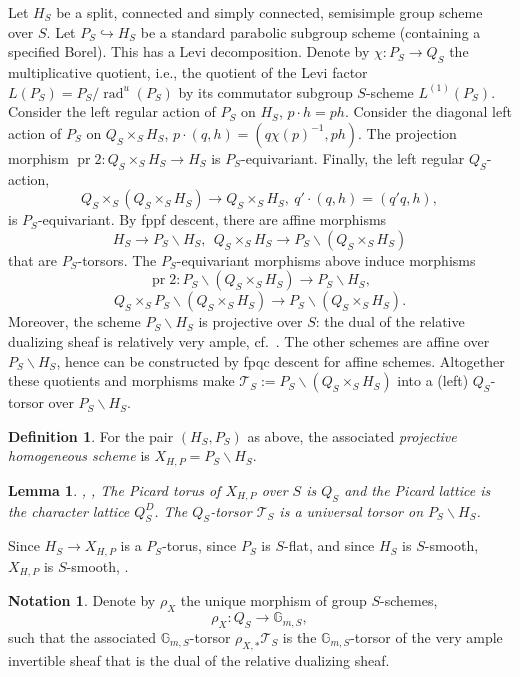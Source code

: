 \documentclass[11pt]{article}
\newtheorem{lemm}[theo]{Lemma}
\theoremstyle{definition}
\newtheorem{defi}[theo]{Definition}
\newtheorem{nota}[theo]{Notation}
\numberwithin{equation}{section}
\numberwithin{figure}{section}
\numberwithin{table}{section}
\newcommand{\mc}{\mathcal}
\newcommand{\mcT}{\mc{T}}
\newcommand{\Gm}[1]{\mathbb{G}_{#1}}
\DeclareMathOperator{\rad}{rad}
\DeclareMathOperator{\prm}{pr}
\newcommand*{\MK}{\mkern 2mu}
\begin{document}
 Let $H_S$ be a split, connected and simply connected, semisimple group scheme over $S$. Let $P_S\hookrightarrow H_S$ be a standard parabolic subgroup scheme (containing a specified Borel). This has a Levi decomposition. Denote by $\chi:P_S\to Q_S$ the multiplicative quotient, i.e., the quotient of the Levi factor $L(P_S)=P_S/\rad^u(P_S)$ by its commutator subgroup $S$-scheme $L^{(1)}(P_S)$. Consider the left regular action of $P_S$ on $H_S$, $p\cdot h = ph$. Consider the diagonal left action of $P_S$ on $Q_S\times_S H_S$, $p\cdot (q,h) = (q\chi(p)^{-1},ph)$. The projection morphism $\prm{2}:Q_S\times_S H_S \to H_S$ is $P_S$-equivariant. Finally, the left regular $Q_S$-action,
\[
Q_S \times_S (Q_S\times_S H_S) \to Q_S\times_S H_S, \ q'\cdot (q,h) = (q'q,h),
\]
is $P_S$-equivariant. By fppf descent, there are affine morphisms
\[
H_S \to P_S\backslash H_S, \ \ Q_S\times_S H_S \to P_S\backslash (Q_S\times_S H_S)
\]
that are $P_S$-torsors. The $P_S$-equivariant morphisms above induce morphisms
\[
\prm{2}:P_S\backslash (Q_S\times_S H_S) \to P_S\backslash H_S,
\]
\[
Q_S\times_S P_S\backslash (Q_S\times_S H_S) \to P_S\backslash (Q_S\times_S H_S).
\]
Moreover, the scheme $P_S\backslash H_S$ is projective over $S$: the dual of the relative dualizing sheaf is relatively very ample, cf.~\cite[p.~186]{Demazure-Aut}. The other schemes are affine over $P_S\backslash H_S$, hence can be constructed by fpqc descent for affine schemes. Altogether these quotients and morphisms make $\mcT_S := P_S\backslash (Q_S\times_S H_S)$ into a (left) $Q_S$-torsor over $P_S\backslash H_S$.

\begin{defi} \label{defn-PHS}
For the pair $(H_S,P_S)$ as above, the associated \emph{projective homogeneous scheme} is $X_{H,P} = P_S\backslash H_S.$
\end{defi}

\begin{lemm}
\cite[Construction 5.3]{Zhu}, \cite[Lemma~2.2$\MK$(vi)]{BCTSk}, 
\cite[Lemma~6.4]{GilleSII}\label{lem-UT}
The Picard torus of $X_{H,P}$ over $S$ is $Q_S$ and the Picard lattice is the character lattice $Q_S^D$. The $Q_S$-torsor $\mcT_S$ is a universal torsor on $P_S\backslash H_S$.
\end{lemm}

Since $H_S\to X_{H,P}$ is a $P_S$-torus, since $P_S$ is $S$-flat, and since $H_S$ is $S$-smooth, $X_{H,P}$ is $S$-smooth, \cite[Proposition~17.7.7]{EGA4}.

\begin{nota}\label{notat-rho}
Denote by $\rho_X$ the unique morphism of group $S$-schemes,
\[
\rho_X:Q_S \to \Gm{m,S},
\]
such that the associated $\Gm{m,S}$-torsor $\rho_{X,*}\mcT_S$ is the $\Gm{m,S}$-torsor of the very ample invertible sheaf that is the dual of the relative dualizing sheaf.
\end{nota}
\end{document}
